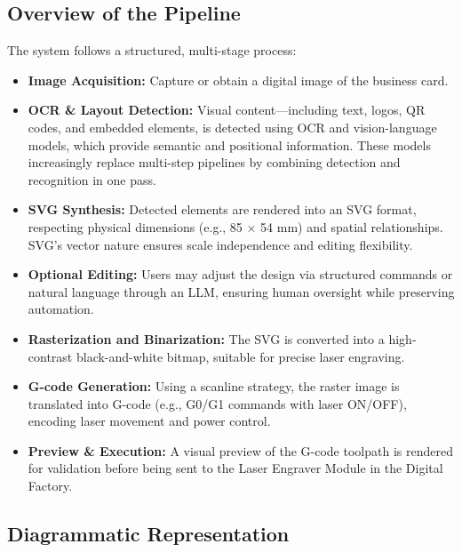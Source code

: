 \subsection{Overview of the Pipeline}
The system follows a structured, multi-stage process:

\begin{itemize}
	\item \textbf{Image Acquisition:} Capture or obtain a digital image of the business card.
	\item \textbf{OCR \& Layout Detection:} Visual content—including text, logos, QR codes, and embedded elements, is detected using OCR and vision-language models, which provide semantic and positional information. These models increasingly replace multi-step pipelines by combining detection and recognition in one pass.
	\item \textbf{SVG Synthesis:} Detected elements are rendered into an SVG format, respecting physical dimensions (e.g., 85 $\times$ 54 mm) and spatial relationships. SVG’s vector nature ensures scale independence and editing flexibility.
	\item \textbf{Optional Editing:} Users may adjust the design via structured commands or natural language through an LLM, ensuring human oversight while preserving automation.
	\item \textbf{Rasterization and Binarization:} The SVG is converted into a high-contrast black-and-white bitmap, suitable for precise laser engraving.
	\item \textbf{G-code Generation:} Using a scanline strategy, the raster image is translated into G-code (e.g., G0/G1 commands with laser ON/OFF), encoding laser movement and power control.
	\item \textbf{Preview \& Execution:} A visual preview of the G-code toolpath is rendered for validation before being sent to the Laser Engraver Module in the Digital Factory.
\end{itemize}

\subsection{Diagrammatic Representation}

